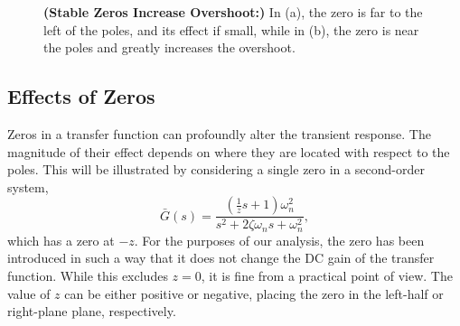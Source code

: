 \begin{figure}[htb]%
\centering
\hfill{}%
\hfill
\hfill{}%
    \caption[]{
    \textbf{(Stable Zeros Increase Overshoot:)} In (a), the zero is far to the left of the poles, and its effect if small, while in (b), the zero is near the poles and greatly increases the overshoot. 
    }
    \label{fig:OverShootStableZeros}
\end{figure}

\subsection{Effects of Zeros}
\label{sec:feedback:EffectsZeros}

Zeros in a transfer function can profoundly alter the transient response. The magnitude of their effect depends on where they are located with respect to the poles. This will be illustrated by considering a single zero in a second-order system,
\begin{equation}
\bar{G}\left( s \right) = \frac{(\frac{1}{z} s +1) \omega _n^2 }{s^2  + 2\zeta \omega _n s + \omega _n^2 },
\label{eqn:TransientResponse:StandFormPlusZero}
\end{equation}
which has a zero at $-z$. For the purposes of our analysis, the zero has been introduced in such a way that it does not change the DC gain of the transfer function. While this excludes $z=0$, it is fine from a practical point of view. The value of $z$ can be either positive or negative, placing the zero in the left-half or right-plane plane, respectively. 



